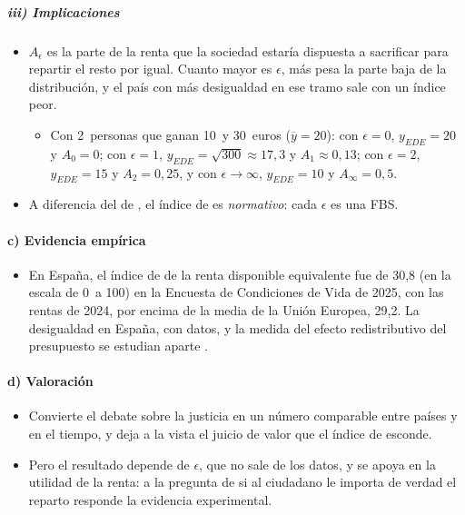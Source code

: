 \documentclass[11pt]{article}
\begin{document}
\subparagraph{iii) Implicaciones}

\begin{itemize}
\item $A_\epsilon$ es la parte de la renta que la sociedad estaría dispuesta a sacrificar para repartir el resto por igual. Cuanto mayor es $\epsilon$, más pesa la parte baja de la distribución, y el país con más desigualdad en ese tramo sale con un índice peor.
  \begin{itemize}
  \item Con 2~personas que ganan 10~y 30~euros ($\overline{y}=20$): con $\epsilon=0$, $y_{EDE}=20$ y $A_0=0$; con $\epsilon=1$, $y_{EDE}=\sqrt{300}\approx17{,}3$ y $A_1\approx0{,}13$; con $\epsilon=2$, $y_{EDE}=15$ y $A_2=0{,}25$, y con $\epsilon\to\infty$, $y_{EDE}=10$ y $A_\infty=0{,}5$.
  \end{itemize}
\item A diferencia del de , el índice de  es \emph{normativo}: cada $\epsilon$ es una FBS.
\end{itemize}

\paragraph{c) Evidencia empírica}

\begin{itemize}
\item En España, el índice de  de la renta disponible equivalente fue de 30,8 (en la escala de 0~a 100) en la Encuesta de Condiciones de Vida de 2025, con las rentas de 2024\nocite{INE2026ECVGini}, por encima de la media de la Unión Europea, 29,2\nocite{Eurostat2026Ilcdi12}. La desigualdad en España, con datos, y la medida del efecto redistributivo del presupuesto se estudian aparte  .
\end{itemize}

\paragraph{d) Valoración}

\begin{itemize}
\item Convierte el debate sobre la justicia en un número comparable entre países y en el tiempo, y deja a la vista el juicio de valor que el índice de  esconde.
\item Pero el resultado depende de $\epsilon$, que no sale de los datos, y se apoya en la utilidad de la renta: a la pregunta de si al ciudadano le importa de verdad el reparto responde la evidencia experimental.
\end{itemize}
\end{document}
